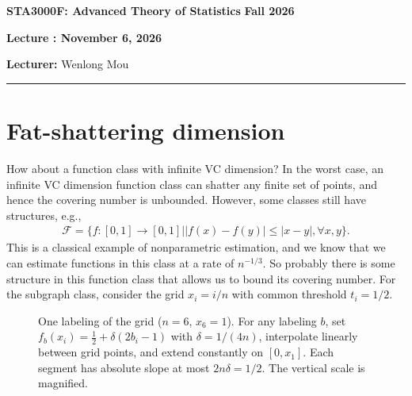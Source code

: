 \documentclass[11pt,letterpaper]{article}
\newcommand{\coursenumber}{STA3000F}
\newcommand{\coursetitle}{Advanced Theory of Statistics}
\newcommand{\courseterm}{Fall 2026}
\newcounter{lecture}
\newcommand{\lecturenumber}{\arabic{lecture}}
\newcommand{\lecturedate}{November 6, 2026}
\newcommand{\lecturer}{Wenlong Mou}
\numberwithin{theorem}{lecture}
\numberwithin{proposition}{lecture}
\numberwithin{lemma}{lecture}
\numberwithin{claim}{lecture}
\numberwithin{corollary}{lecture}
\numberwithin{definition}{lecture}
\numberwithin{conjecture}{lecture}
\numberwithin{remark}{lecture}
\numberwithin{example}{lecture}
\numberwithin{equation}{lecture}
\newcommand{\makelecturenotesheader}{%
  \noindent
  \textbf{\coursenumber: \coursetitle}%
  \hfill
  \textbf{\courseterm}

  \begin{center}
    {\Large\bfseries Lecture \lecturenumber: \lecturedate}
  \end{center}

  \noindent
  \textbf{Lecturer:} \lecturer
  \par\medskip
  \hrule
  \bigskip
}
\begin{document}
\makelecturenotesheader
\section{Fat-shattering dimension}
How about a function class with infinite VC dimension? In the worst case, an infinite VC dimension function class can shatter any finite set of points, and hence the covering number is unbounded. However, some classes still have structures, e.g.,
\begin{align*}
 \mathcal{F} = \Big\{ f: [0, 1] \to [0, 1] \big| |f (x) - f (y)| \leq |x - y|, \forall x, y \Big\}.
\end{align*}
This is a classical example of nonparametric estimation, and we know that we can estimate functions in this class at a rate of $n^{-1/3}$. So probably there is some structure in this function class that allows us to bound its covering number. For the subgraph class, consider the grid $x_i=i/n$ with common threshold $t_i=1/2$.

\begin{figure}[!htbp]
  \centering
  \caption{One labeling of the grid ($n=6$, $x_6=1$). For any labeling $b$, set $f_b(x_i)=\tfrac12+\delta(2b_i-1)$ with $\delta=1/(4n)$, interpolate linearly between grid points, and extend constantly on $[0,x_1]$. Each segment has absolute slope at most $2n\delta=1/2$. The vertical scale is magnified.}
  \label{fig:lec8-lipschitz-shattering}
\end{figure}
\end{document}
